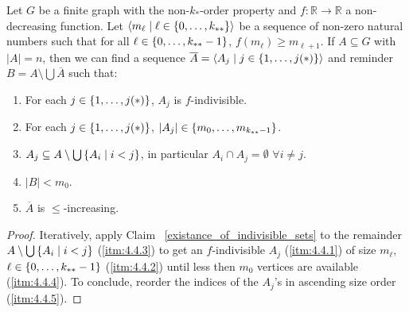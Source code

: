     \begin{lemma}[Claim 4.4 + 4.5] \label{existance_of_ordered_f_indivisible_partitions}
        Let $G$ be a finite graph with the non-$k_{*}$-order property and $f: \mathbb{R} \longrightarrow \mathbb{R}$ a non-decreasing function.
        Let $\left< m_\ell \mid \ell \in \left\{ 0, \dots, k_{**} \right\} \right>$ be a sequence of non-zero natural numbers such that
        for all $\ell \in \left\{ 0, \dots, k_{**}-1 \right\}$, $f(m_{\ell}) \geq m_{\ell+1}$.
        If $A \subseteq G$ with $|A| = n$, then we can find a sequence $\overline{A} = \left< A_j \mid j \in \left\{ 1, \dots, j(*) \right\} \right>$
        and reminder $B = A \setminus \bigcup \overline{A}$ such that:
        \begin{enumerate}
            \item \label{itm:4.4.1} For each $j \in \left\{ 1, \dots, j(*) \right\}$, $A_j$ is $f$-indivisible.
            \item \label{itm:4.4.2} For each $j \in \left\{ 1, \dots, j(*) \right\}$, $|A_j| \in \left\{ m_0, \dots, m_{k_{**}-1} \right\}$.
            \item \label{itm:4.4.3} $A_j \subseteq A \setminus \bigcup\left\{ A_i \mid i < j \right\}$, in particular $A_i \cap A_j = \emptyset$ $\forall i \neq j$.
            \item \label{itm:4.4.4} $|B| < m_0$.
            \item \label{itm:4.4.5} $\overline{A}$ is $\leq$-increasing.
        \end{enumerate}
        \begin{proof}
            Iteratively, apply Claim ~\ref{existance_of_indivisible_sets} to the remainder $A \setminus \bigcup \left\{ A_i \mid i < j \right\}$
            (\ref{itm:4.4.3}) to get an $f$-indivisible $A_j$ (\ref{itm:4.4.1}) of size $m_\ell$, $\ell \in \left\{ 0, \dots, k_{**}-1 \right\}$
            (\ref{itm:4.4.2}) until less then $m_0$ vertices are available (\ref{itm:4.4.4}).
            To conclude, reorder the indices of the $A_j$'s in ascending size order (\ref{itm:4.4.5}).
        \end{proof}
    \end{lemma}

